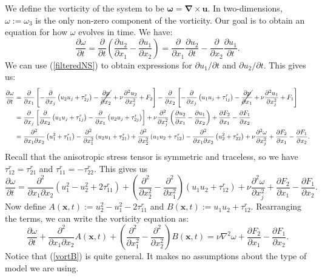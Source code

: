 \documentclass[11pt,a4paper]{article}
\newcommand{\eq}[1]{(\ref{#1})}
\begin{document}
We define the vorticity of the system to be $\boldsymbol{\omega} = \boldsymbol{\nabla}\times\boldsymbol{u}$. In two-dimensions, $\omega:= \omega_3$ is the only non-zero component of the vorticity. Our goal is to obtain an equation for how $\omega$ evolves in time. We have:
$$\frac{\partial \omega}{\partial t}   =  \frac{\partial }{\partial t}\left(\frac{\partial u_2}{\partial x_1} -\frac{\partial u_1}{\partial x_2} \right)=  \frac{\partial }{\partial x_1}\frac{\partial u_2}{\partial t} -\frac{\partial }{\partial x_2}\frac{\partial u_1}{\partial t}.$$
We can use \eq{filteredNS} to obtain expressions for ${\partial u_1}/{\partial t}$ and ${\partial u_2}/{\partial t}$. This gives us:
\begin{align*}
\frac{\partial \omega}{\partial t} &= \frac{\partial }{\partial x_1}\left[- \frac{\partial }{\partial x_j}\left({u}_2{u}_j +\tau_{2j}^r\right)-\cancel{\frac{\partial {p}}{\partial x_2}}+  \nu \frac{\partial^2u_2}{\partial x_j^2}+ {F}_2\right]-\frac{\partial }{\partial x_2}\left[- \frac{\partial }{\partial x_j}\left({u}_1{u}_j +\tau_{1j}^r\right)-\cancel{\frac{\partial {p}}{\partial x_1}}+ \nu \frac{\partial^2u_1}{\partial x_j^2}+ {F}_1\right]\\
&= \frac{\partial }{\partial x_j}\left[ \frac{\partial }{\partial x_2}\left({u}_1{u}_j +\tau_{1j}^r\right) - \frac{\partial }{\partial x_1}\left({u}_2{u}_j +\tau_{2j}^r\right)\right] +\nu \frac{\partial^2}{\partial x_j^2}\left(\frac{\partial u_2}{\partial x_1} -\frac{\partial u_1}{\partial x_2}\right) +\frac{\partial F_2}{\partial x_1} -\frac{\partial F_1}{\partial x_2}\\
&= \frac{\partial^2 }{\partial x_1\partial x_2}\left({u}_1^2 +\tau_{11}^r\right) - \frac{\partial^2 }{\partial x_1^2}\left({u}_2{u}_1 +\tau_{21}^r\right)+\frac{\partial^2 }{\partial x_2^2}\left({u}_1{u}_2 +\tau_{12}^r\right) - \frac{\partial^2 }{\partial x_1\partial x_2}\left({u}_2^2+\tau_{22}^r\right) +\nu \frac{\partial^2\omega}{\partial x_j^2}+\frac{\partial F_2}{\partial x_1} -\frac{\partial F_1}{\partial x_2}.
\end{align*}
Recall that the anisotropic stress tensor is symmetric and traceless, so we have $\tau_{12}^r=\tau_{21}^r$ and $\tau_{11}^r = -\tau_{22}^r$. This gives us
$$\frac{\partial \omega}{\partial t} = \frac{\partial^2 }{\partial x_1\partial x_2}\left({u}_1^2 -{u}_2^2+2\tau_{11}^r\right) +\left(\frac{\partial^2 }{\partial x_2^2} - \frac{\partial^2 }{\partial x_1^2}\right)\left({u}_1{u}_2 +\tau_{12}^r\right) +\nu \frac{\partial^2\omega}{\partial x_j^2}+\frac{\partial F_2}{\partial x_1} -\frac{\partial F_1}{\partial x_2}.$$
Now define $A(\boldsymbol{x}, t)  := u_2^2-u_1^2- 2\tau_{11}^r$ and $B(\boldsymbol{x}, t) :=u_1u_2 + \tau_{12}^r$. Rearranging the terms, we can write the vorticity equation as:
\begin{equation}\label{vortB}
\frac{\partial \omega}{\partial t}  + \frac{\partial^2 }{\partial x_1\partial x_2}A(\boldsymbol{x}, t) + \left(\frac{\partial^2}{\partial x_1^2} - \frac{\partial^2}{\partial x_2^2}\right)B(\boldsymbol{x}, t) = \nu{\nabla}^2\omega+\frac{\partial F_2}{\partial x_1} - \frac{\partial F_1}{\partial x_2} .
\end{equation}
Notice that \eq{vortB} is quite general. It makes no assumptions about the type of model we are using. 
\end{document}
